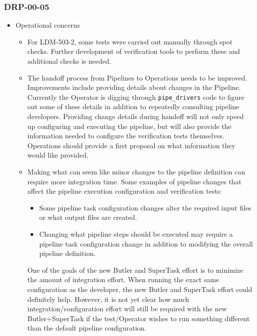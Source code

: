 \documentclass[DM,lsstdraft,STR,toc]{lsstdoc}
\begin{document}
\subsubsection{DRP-00-05}
\begin{itemize}
\item Operational concerns
\begin{itemize}
  \item For LDM-503-2, some tests were carried out manually through 
  spot checks.  Further development of verification tools to perform
  these and additional checks is needed.
  \item The handoff process from Pipelines to Operations needs to
  be improved.  Improvements include providing details about changes
  in the Pipeline.   Currently the Operator is digging through
  \texttt{pipe{\_}drivers} code to figure out some of these details 
  in addition to repeatedly consulting pipeline developers.
  Providing change details during handoff will not only
  speed up configuring and executing the pipeline, but will also
  provide the information needed to configure the verification tests
  themselves.  Operations should provide a first proposal on what
  information they would like provided.

  \item Making what can seem like minor changes to the pipeline
  definition can require more integration time.  Some examples of 
  pipeline changes that affect the pipeline 
  execution configuration and verification tests:
  \begin{itemize}
  \item Some pipeline task configuration changes alter the
      required input files or what output files are created.  
  \item Changing what pipeline steps should be executed 
      may require a pipeline task configuration change in
      addition to modifying the overall pipeline definition.
  \end{itemize}
  One of the goals of the new Butler and SuperTask effort is
  to minimize the amount of integration effort. When running 
  the exact same configuration as the developer, the new 
  Butler and SuperTask effort could 
  definitely help.   However, it is not yet clear how much
  integration/configuration effort will still be required with the
  new Butler+SuperTask if the test/Operator wishes to run 
  something different than the default pipeline configuration.


\end{itemize}
\end{itemize}
\end{document}
